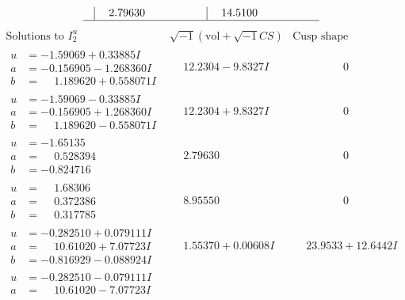 \documentclass[1p]{elsarticle_modified}
\theoremstyle{definition}
\newcommand{\I}{\sqrt{-1}}
\begin{document}
$$\begin{array}{c|c|c}
 & \phantom{-}2.79630\phantom{ +0.000000I} & \phantom{-}14.5100\phantom{ +0.000000I}\\
 \hline 
 \end{array}$$\newpage$$\begin{array}{c|c|c}  
\text{Solutions to }I^u_{2}& \I (\text{vol} + \sqrt{-1}CS) & \text{Cusp shape}\\
 \hline 
\begin{aligned}
u &= -1.59069 + 0.33885 I \\
a &= -0.156905 - 1.268360 I \\
b &= \phantom{-}1.189620 + 0.558071 I\end{aligned}
 & \phantom{-}12.2304 - 9.8327 I & \phantom{-0.000000 } 0 \\ \hline\begin{aligned}
u &= -1.59069 - 0.33885 I \\
a &= -0.156905 + 1.268360 I \\
b &= \phantom{-}1.189620 - 0.558071 I\end{aligned}
 & \phantom{-}12.2304 + 9.8327 I & \phantom{-0.000000 } 0 \\ \hline\begin{aligned}
u &= -1.65135\phantom{ +0.000000I} \\
a &= \phantom{-}0.528394\phantom{ +0.000000I} \\
b &= -0.824716\phantom{ +0.000000I}\end{aligned}
 & \phantom{-}2.79630\phantom{ +0.000000I} & \phantom{-0.000000 } 0 \\ \hline\begin{aligned}
u &= \phantom{-}1.68306\phantom{ +0.000000I} \\
a &= \phantom{-}0.372386\phantom{ +0.000000I} \\
b &= \phantom{-}0.317785\phantom{ +0.000000I}\end{aligned}
 & \phantom{-}8.95550\phantom{ +0.000000I} & \phantom{-0.000000 } 0 \\ \hline\begin{aligned}
u &= -0.282510 + 0.079111 I \\
a &= \phantom{-}10.61020 + 7.07723 I \\
b &= -0.816929 - 0.088924 I\end{aligned}
 & \phantom{-}1.55370 + 0.00608 I & \phantom{-}23.9533 + 12.6442 I \\ \hline\begin{aligned}
u &= -0.282510 - 0.079111 I \\
a &= \phantom{-}10.61020 - 7.07723 I \\

\end{aligned}
\end{array}$$
\end{document}
